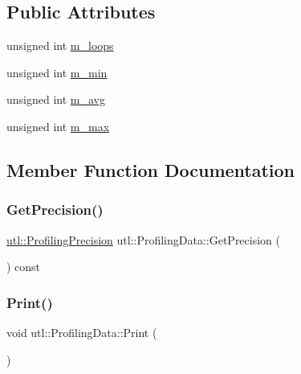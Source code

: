 \subsection*{Public Attributes}
\begin{DoxyCompactItemize}
\item 
unsigned int \mbox{\hyperlink{structutl_1_1_profiling_data_a1262c85d877f95e243991d5d82e8aa3f}{m\+\_\+loops}}
\item 
unsigned int \mbox{\hyperlink{structutl_1_1_profiling_data_a61e7406f3b528d1740ce266673cc725b}{m\+\_\+min}}
\item 
unsigned int \mbox{\hyperlink{structutl_1_1_profiling_data_aa37adf9f2cd78f78d581b1bf12130910}{m\+\_\+avg}}
\item 
unsigned int \mbox{\hyperlink{structutl_1_1_profiling_data_a5590a66a5ce2b5850ca8053ce62b4edc}{m\+\_\+max}}
\end{DoxyCompactItemize}


\subsection{Member Function Documentation}
\mbox{\label{structutl_1_1_profiling_data_a4f2ba31f629d70115facc3aa7dc3fe11}} 
\subsubsection{\texorpdfstring{Get\+Precision()}{GetPrecision()}}
{\footnotesize\ttfamily \mbox{\hyperlink{namespaceutl_ad221bb3fac593651670bdc0263b92707}{utl\+::\+Profiling\+Precision}} utl\+::\+Profiling\+Data\+::\+Get\+Precision (\begin{DoxyParamCaption}{ }\end{DoxyParamCaption}) const}

\mbox{\label{structutl_1_1_profiling_data_a3e8f6def33303b7ce5320fb09155dbb3}} 
\subsubsection{\texorpdfstring{Print()}{Print()}}
{\footnotesize\ttfamily void utl\+::\+Profiling\+Data\+::\+Print (\begin{DoxyParamCaption}{ }\end{DoxyParamCaption})}

